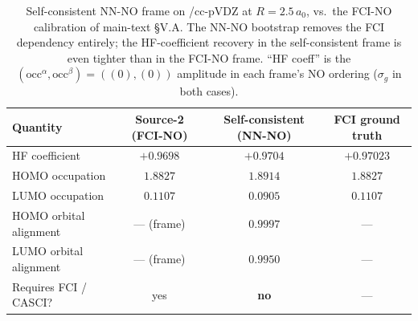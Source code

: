 \documentclass[journal=jctcce,manuscript=suppinfo,layout=traditional]{achemso}
\begin{document}
\begin{table}[h]
\centering
\caption{Self-consistent NN-NO frame on /cc-pVDZ at
$R=2.5\,a_0$, vs.\ the FCI-NO calibration of main-text \S V.A.
The NN-NO bootstrap removes the FCI dependency entirely; the
HF-coefficient recovery in the self-consistent frame is even tighter
than in the FCI-NO frame. ``HF coeff'' is the
$(\mathrm{occ}^\alpha,\mathrm{occ}^\beta) = ((0),(0))$ amplitude in
each frame's NO ordering ($\sigma_g$ in both cases).}
\label{tab:h2_nn_no}
\small
\begin{tabular}{lccc}
\hline
Quantity & Source-2 (FCI-NO) & Self-consistent (NN-NO) & FCI ground truth \\
\hline
HF coefficient                & $+0.9698$ & $+0.9704$ & $+0.97023$ \\
HOMO occupation               & $1.8827$  & $1.8914$  & $1.8827$ \\
LUMO occupation               & $0.1107$  & $0.0905$  & $0.1107$ \\
HOMO orbital alignment        & --- (frame) & $0.9997$ & --- \\
LUMO orbital alignment        & --- (frame) & $0.9950$ & --- \\
Requires FCI / CASCI?         & yes & \textbf{no} & --- \\
\hline
\end{tabular}
\end{table}
\end{document}
